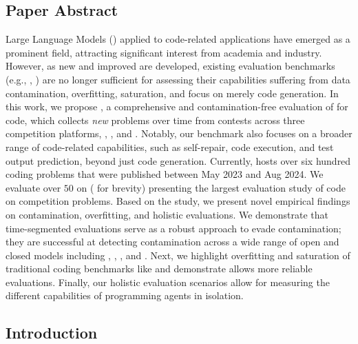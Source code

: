 \subsection*{Paper Abstract}
  \noindent Large Language Models (\llms{}) applied to code-related applications have emerged as a prominent field, attracting significant interest from academia and industry.
  However, as new and improved \llms{} are developed, existing evaluation benchmarks (e.g., \humaneval{}, \mbpp{}) are no longer sufficient for assessing their capabilities suffering from data contamination, overfitting, saturation, and focus on merely code generation.
  In this work, we propose \livecodebench{}, a comprehensive and contamination-free evaluation of \llms{} for code, which collects \textit{new} problems over time from contests across three competition platforms, \leetcode{}, \atcoder{}, and \codeforces{}.
  Notably, our benchmark also focuses on a broader range of code-related capabilities, such as self-repair, code execution, and test output prediction, beyond just code generation.
  Currently, \livecodebench{} hosts over six hundred coding problems that were published between May 2023 and Aug 2024.
  We evaluate over $50$ \llms{} on \livecodebench{} (\lcb{} for brevity) presenting the largest evaluation study of code \llms{} on competition problems. 
  Based on the study, we present novel empirical findings on contamination, overfitting, and holistic evaluations. 
  We demonstrate that time-segmented evaluations serve as a robust approach to evade contamination; they are successful at detecting contamination across a wide range of open and closed models including \gptfouro{}, \claude{}, \deepseek{}, and \codestral{}.
  Next, we highlight overfitting and saturation of traditional coding benchmarks like \humaneval{} and demonstrate \lcb{} allows more reliable evaluations.
  Finally, our holistic evaluation scenarios allow for measuring the different capabilities of programming agents in isolation.



\subsection{Introduction}
\label{sec:livecodebench-introduction}


